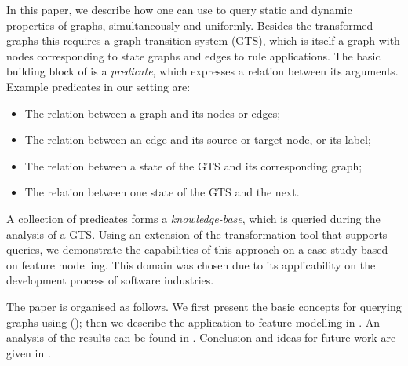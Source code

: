 \medskip\noindent In this paper, we describe how one can use \PROLOG to query
static and dynamic properties of graphs, simultaneously and uniformly.  Besides
the transformed graphs this requires a graph transition system (GTS), which is
itself a graph with nodes corresponding to state graphs and edges to rule
applications. The basic building block of \PROLOG is a \emph{predicate}, which
expresses a relation between its arguments. Example predicates in our setting
are:
\begin{itemize}\noitemsep
\item The relation between a graph and its nodes or edges;
\item The relation between an edge and its source or target node, or its label;
\item The relation between a state of the GTS and its corresponding graph;
\item The relation between one state of the GTS and the next.
\end{itemize}

\medskip\noindent A collection of \Prolog predicates forms a
\emph{knowledge-base}, which is queried during the analysis of a GTS. Using an
extension of the transformation tool \GROOVE that supports \PROLOG queries, we
demonstrate the capabilities of this approach on a case study based on feature
modelling. This domain was chosen due to its applicability on the development
process of software industries.

\medskip\noindent The paper is organised as follows. We first present the basic
concepts for querying graphs using \PROLOG (); then we describe
the application to feature modelling in . An analysis of the
results can be found in . Conclusion and ideas for future work
are given in .

%
%